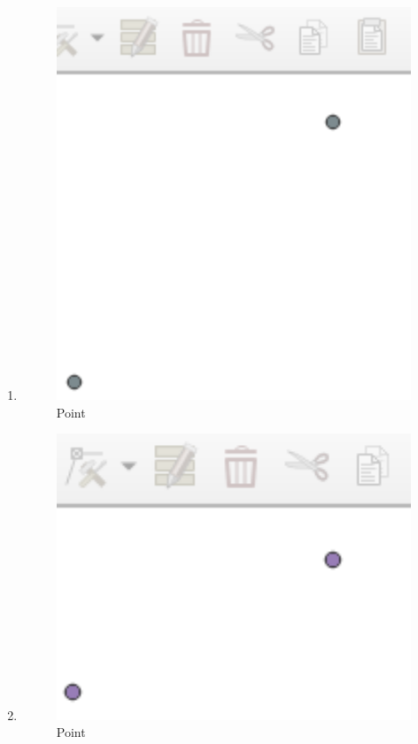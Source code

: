 \begin{enumerate}
	\item 
	
	\begin{figure}[H]
		\includegraphics[width=12cm]{figures/1174059/Python1/soal2.PNG}
		\centering
		\caption{Point}
	\end{figure}
	
	\item 
	
	\begin{figure}[H]
		\includegraphics[width=12cm]{figures/1174059/Python1/soal3.PNG}
		\centering
		\caption{Point}
	\end{figure}
	

\end{enumerate}
